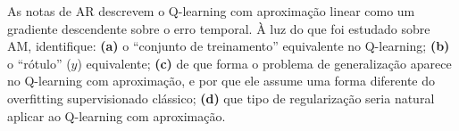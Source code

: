 \documentclass[12pt,a4paper]{article}
\begin{document}
\begin{perguntabox}
As notas de AR descrevem o Q-learning com aproximação linear como um gradiente descendente sobre o erro temporal. À luz do que foi estudado sobre AM, identifique: \textbf{(a)} o ``conjunto de treinamento'' equivalente no Q-learning; \textbf{(b)} o ``rótulo'' ($y$) equivalente; \textbf{(c)} de que forma o problema de generalização aparece no Q-learning com aproximação, e por que ele assume uma forma diferente do overfitting supervisionado clássico; \textbf{(d)} que tipo de regularização seria natural aplicar ao Q-learning com aproximação.
\end{perguntabox}



\end{document}
